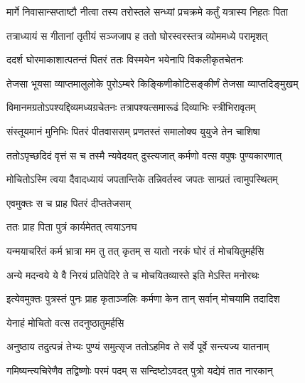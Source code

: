 \twolineshloka
{मार्गे निवासान्सप्ताष्टौ नीत्वा तस्य तरोस्तले}
{सन्ध्यां प्रचक्रमे कर्तुं यत्रास्य निहतः पिता} %

\twolineshloka
{तत्राध्यायं स गीतानां तृतीयं सञ्जजाप ह}
{ततो घोरस्वरस्तत्र व्योममध्ये परामृशत्} %

\twolineshloka
{ददर्श घोरमाकाशात्पतन्तं पितरं ततः}
{विस्मयेन भयेनापि विकलीकृतचेतनः} %

\twolineshloka
{तेजसा भूयसा व्याप्तमालुलोके पुरोऽम्बरे}
{किङ्किणीकोटिसङ्कीर्णं तेजसा व्याप्तदिङ्मुखम्} %

\twolineshloka
{विमानमग्रतोऽपश्यद्दिव्यमध्यग्रचेतनः}
{तत्रापश्यत्समारूढं दिव्याभिः स्त्रीभिरावृतम्} %

\twolineshloka
{संस्तूयमानं मुनिभिः पितरं पीतवाससम्}
{प्रणतस्तं समालोक्य युयुजे तेन चाशिषा} %

\twolineshloka
{ततोऽपृच्छदिदं वृत्तं स च तस्मै न्यवेदयत्}
{दुस्त्यजात् कर्मणो वत्स वपुषः पुण्यकारणात्} %

\twolineshloka
{मोचितोऽस्मि त्वया दैवादध्यायं जपतान्तिके}
{तन्निवर्तस्व जपतः साम्प्रतं त्वामुपस्थितम्} %



\onelineshloka
{एवमुक्तः स च प्राह पितरं दीप्ततेजसम्} %




\onelineshloka
{ततः प्राह पिता पुत्रं कार्यमेतत् त्वयाऽनघ} %

\twolineshloka
{यन्मयाचरितं कर्म भ्रात्रा मम तु तत् कृतम्}
{स यातो नरकं घोरं तं मोचयितुमर्हसि} %

\twolineshloka
{अन्ये मदन्वये ये वै निरयं प्रतिपेदिरे}
{ते च मोचयितव्यास्ते इति मेऽस्ति मनोरथः} %

\twolineshloka
{इत्येवमुक्तः पुत्रस्तं पुनः प्राह कृताञ्जलिः}
{कर्मणा केन तान् सर्वान् मोचयामि तदादिश} %



\onelineshloka
{येनाहं मोचितो वत्स तदनुष्ठातुमर्हसि} %

\twolineshloka
{अनुष्ठाय तदुत्पन्नं तेभ्यः पुण्यं समुत्सृज}
{ततोऽहमिव ते सर्वे पूर्वे सन्त्यज्य यातनाम्} %

\twolineshloka
{गमिष्यन्त्यचिरेणैव तद्विष्णोः परमं पदम्}
{स सन्दिष्टोऽवदत् पुत्रो यद्येवं तात नारकान्} %

